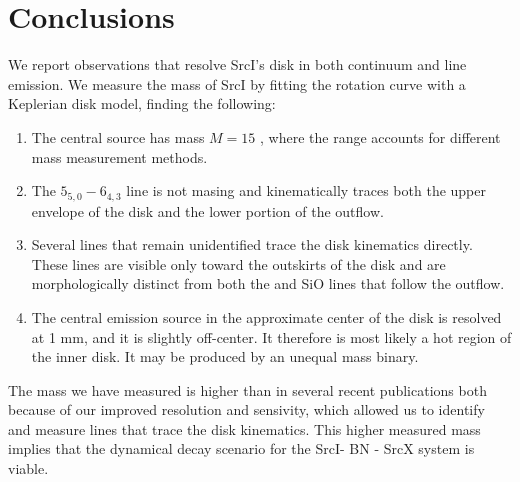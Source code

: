 \documentclass[twocolumn]{aastex61}
\newcommand{\sourcei}{SrcI\xspace}
\newcommand{\sourcex}{SrcX\xspace}
\begin{document}
\section{Conclusions}
\label{sec:conclusions}
We report observations that resolve \sourcei's disk in both continuum
and line emission.  We measure the mass of \sourcei by fitting the 
rotation curve with a Keplerian disk model, finding the following:

\begin{enumerate}
    \item The central source has mass $M=15$ \msun, where the range
        accounts for different mass measurement methods.
    \item The \water $5_{5,0}-6_{4,3}$ line is not masing and kinematically
        traces both the upper envelope of the disk and the lower portion of
        the outflow.
    \item Several lines that remain unidentified trace the disk kinematics
        directly.  These lines are visible only toward the outskirts of the
        disk and are morphologically distinct from both the \water and SiO
        lines that follow the outflow.
    \item The central emission source in the approximate center of the disk
        is resolved at 1 mm, and it is slightly off-center.  It therefore is
        most likely a hot region of the inner disk.  It may be produced
        by an unequal mass binary.
\end{enumerate}

The mass we have measured is higher than in several recent publications both
because of our improved resolution and sensivity, which allowed us to identify
and measure lines that trace the disk kinematics.  This higher measured mass
implies that the dynamical decay scenario for the \sourcei - BN - \sourcex
system is viable.


\end{document}
